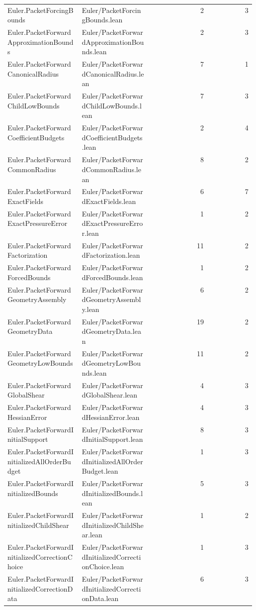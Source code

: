 \begin{longtable}{p{0.30\linewidth}p{0.28\linewidth}rr}
Euler.PacketForcingBounds & Euler/PacketForcingBounds.lean & 2 & 3\\
Euler.PacketForwardApproximationBounds & Euler/PacketForwardApproximationBounds.lean & 2 & 3\\
Euler.PacketForwardCanonicalRadius & Euler/PacketForwardCanonicalRadius.lean & 7 & 1\\
Euler.PacketForwardChildLowBounds & Euler/PacketForwardChildLowBounds.lean & 7 & 3\\
Euler.PacketForwardCoefficientBudgets & Euler/PacketForwardCoefficientBudgets.lean & 2 & 4\\
Euler.PacketForwardCommonRadius & Euler/PacketForwardCommonRadius.lean & 8 & 2\\
Euler.PacketForwardExactFields & Euler/PacketForwardExactFields.lean & 6 & 7\\
Euler.PacketForwardExactPressureError & Euler/PacketForwardExactPressureError.lean & 1 & 2\\
Euler.PacketForwardFactorization & Euler/PacketForwardFactorization.lean & 11 & 2\\
Euler.PacketForwardForcedBounds & Euler/PacketForwardForcedBounds.lean & 1 & 2\\
Euler.PacketForwardGeometryAssembly & Euler/PacketForwardGeometryAssembly.lean & 6 & 2\\
Euler.PacketForwardGeometryData & Euler/PacketForwardGeometryData.lean & 19 & 2\\
Euler.PacketForwardGeometryLowBounds & Euler/PacketForwardGeometryLowBounds.lean & 11 & 2\\
Euler.PacketForwardGlobalShear & Euler/PacketForwardGlobalShear.lean & 4 & 3\\
Euler.PacketForwardHessianError & Euler/PacketForwardHessianError.lean & 4 & 3\\
Euler.PacketForwardInitialSupport & Euler/PacketForwardInitialSupport.lean & 8 & 3\\
Euler.PacketForwardInitializedAllOrderBudget & Euler/PacketForwardInitializedAllOrderBudget.lean & 1 & 3\\
Euler.PacketForwardInitializedBounds & Euler/PacketForwardInitializedBounds.lean & 5 & 3\\
Euler.PacketForwardInitializedChildShear & Euler/PacketForwardInitializedChildShear.lean & 1 & 2\\
Euler.PacketForwardInitializedCorrectionChoice & Euler/PacketForwardInitializedCorrectionChoice.lean & 1 & 3\\
Euler.PacketForwardInitializedCorrectionData & Euler/PacketForwardInitializedCorrectionData.lean & 6 & 3\\

\end{longtable}
